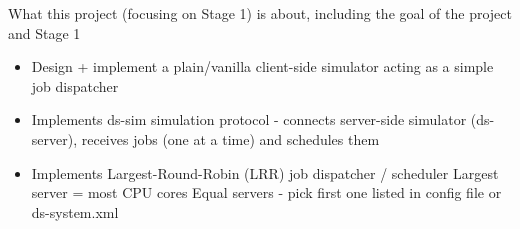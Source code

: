 \begin{itshape}
What this project (focusing on Stage 1) is about, including the goal of the project and Stage 1
\end{itshape}

\begin{itemize}
    \item Design + implement a plain/vanilla client-side simulator acting as a simple job dispatcher
    \item Implements ds-sim simulation protocol - connects server-side simulator (ds-server), receives jobs (one at a time) and schedules them
    \item Implements Largest-Round-Robin (LRR) job dispatcher / scheduler
        \subitem Largest server = most CPU cores
        \subitem Equal servers - pick first one listed in config file or ds-system.xml
\end{itemize}